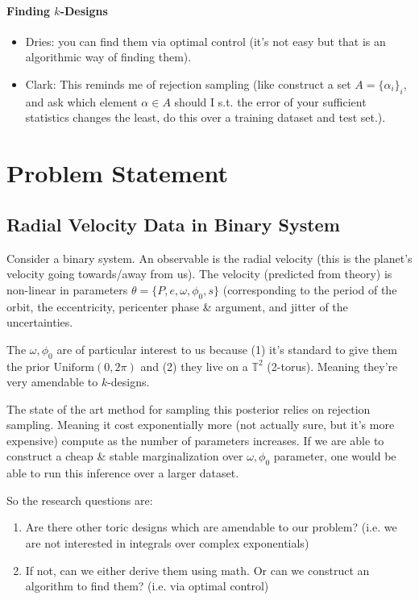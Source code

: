\documentclass{article}
\begin{document}
\paragraph{Finding $k$-Designs}
\begin{itemize}
	\item Dries: you can find them via optimal control (it's not easy but that is an algorithmic way of finding them).
	\item  Clark: This reminds me of rejection sampling (like construct a set $A = \{\alpha_i\}_i$, and ask which element $\alpha \in A$ should I s.t. the error of your sufficient statistics changes the least, do this over a training dataset and test set.).
\end{itemize}

\section{Problem Statement}
\subsection{Radial Velocity Data in Binary System}
Consider a binary system. An observable is the radial velocity (this is the planet's velocity going towards/away from us). The velocity (predicted from theory) is non-linear in parameters $\theta = \{P, e, \omega, \phi_0, s\}$ (corresponding to the period of the orbit, the eccentricity, pericenter phase \& argument, and jitter of  the uncertainties. 

The $\omega,\phi_0$ are of particular interest to us because (1) it's standard \cite{Price_Whelan_2017} to give them the prior $\text{Uniform}(0, 2\pi)$ and (2) they live on a $\mathbb T^2$ (2-torus). Meaning they're very amendable to $k$-designs.

The state of the art method for sampling this posterior \cite{Price_Whelan_2017} relies on rejection sampling. Meaning it cost exponentially more (not actually sure, but it's more expensive) compute as the number of parameters increases. If we are able to construct a cheap \& stable marginalization over $\omega, \phi_0$ parameter, one would be able to run this inference over a larger dataset.

So the research questions are:
\begin{enumerate}
	\item Are there other toric designs which are amendable to our problem? (i.e. we are not interested in integrals over complex exponentials)
	\item If not, can we either derive them using math. Or can we construct an algorithm to find them? (i.e. via optimal control)
\end{enumerate}

\newpage


\end{document}
